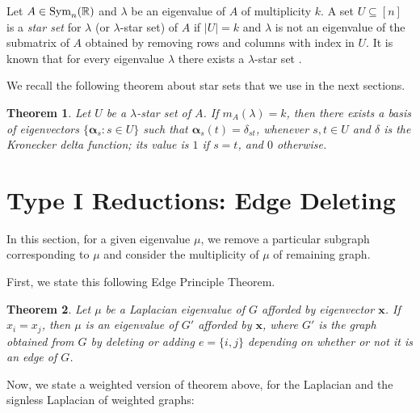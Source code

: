 \documentclass{amsart}
\newtheorem{theorem}{Theorem}
\theoremstyle{remark}
\begin{document}


Let $A\in \text{\rm Sym}_{n}(\mathbb{R})$ and $\lambda$ be an eigenvalue of $A$ of multiplicity $k$. A set $U\subseteq [n]$ is a \textit{star set} for $\lambda$ (or $\lambda$-star set) of  $A$ if $|U|=k$ and $\lambda$  is not an eigenvalue of the submatrix of $A$ obtained by removing rows and columns with index in $U$. It is known that for every eigenvalue $\lambda$ there exists a $\lambda$-star set \cite{CRS}.

We recall the following theorem about star sets that we use in the next sections.
\begin{theorem}\label{starcorr}{\rm \cite[Theorem 7.2.6]{CRS}}
Let $U$ be  a $\lambda$-star set of $A$.   If $m_{A}(\lambda)=k$, then there exists a basis of eigenvectors $\{\pmb{\alpha}_{s}:s\in U\}$  such that $\pmb{\alpha}_{s}(t)=\delta_{st}$, whenever $s,t\in U$ and $\delta$ is the Kronecker delta function; its value is $1$ if $s=t$, and $0$ otherwise.
\end{theorem}



\section{Type I Reductions:  Edge Deleting}
In this section, for a given eigenvalue $\mu$, we remove a particular subgraph  corresponding to $\mu$ and consider the multiplicity of $\mu$ of remaining graph.


First, we state this following Edge  Principle Theorem.
\begin{theorem}{\rm \cite{Me}}
Let  $\mu$ be  a Laplacian  eigenvalue  of  $G$  afforded  by eigenvector  $\pmb{x}$. If $x_{i}=x_{j}$,  then  $\mu$ is  an  eigenvalue  of  $G'$ afforded  by  $\pmb{x}$,  where  $G'$  is the  graph  obtained  from  $G$ by  deleting  or  adding  $e=\{i, j\}$  depending  on  whether or  not  it  is  an  edge  of  $G$.
\end{theorem} 

Now, we state a weighted version of theorem above, for the Laplacian and the signless Laplacian of weighted graphs:
\end{document}
